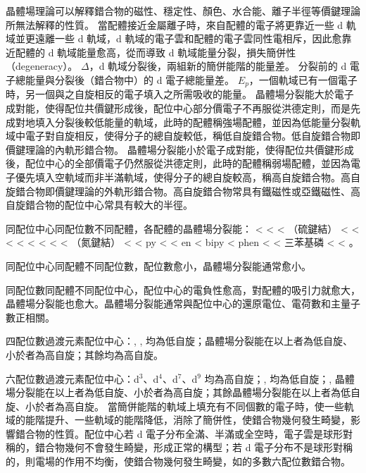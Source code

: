 \documentclass[a4paper,12pt]{report}
\begin{document}
晶體場理論可以解釋錯合物的磁性、穩定性、顏色、水合能、離子半徑等價鍵理論所無法解釋的性質。
當配體接近金屬離子時，來自配體的電子將更靠近一些 d 軌域並更遠離一些 d 軌域，d 軌域的電子雲和配體的電子雲同性電相斥，因此愈靠近配體的 d 軌域能量愈高，從而導致 d 軌域能量分裂，損失簡併性（degeneracy）。
$\Delta$，d 軌域分裂後，兩組新的簡併能階的能量差。
分裂前的 d 電子總能量與分裂後（錯合物中）的 d 電子總能量差。
$E_p$，一個軌域已有一個電子時，另一個與之自旋相反的電子填入之所需吸收的能量。
晶體場分裂能大於電子成對能，使得配位共價鍵形成後，配位中心部分價電子不再服從洪德定則，而是先成對地填入分裂後較低能量的軌域，此時的配體稱強場配體，並因為低能量分裂軌域中電子對自旋相反，使得分子的總自旋較低，稱低自旋錯合物。低自旋錯合物即價鍵理論的內軌形錯合物。
晶體場分裂能小於電子成對能，使得配位共價鍵形成後，配位中心的全部價電子仍然服從洪德定則，此時的配體稱弱場配體，並因為電子優先填入空軌域而非半滿軌域，使得分子的總自旋較高，稱高自旋錯合物。高自旋錯合物即價鍵理論的外軌形錯合物。高自旋錯合物常具有鐵磁性或亞鐵磁性、高自旋錯合物的配位中心常具有較大的半徑。
\bit
\item 同配位中心同配位數不同配體，各配體的晶體場分裂能： <  <  < （硫鍵結） <  <  <  <  <  <  <  < （氮鍵結） <  < py <  < en < bipy < phen <  < 三苯基磷  <  < 。
\item 同配位中心同配體不同配位數，配位數愈小，晶體場分裂能通常愈小。
\item 同配位數同配體不同配位中心，配位中心的電負性愈高，對配體的吸引力就愈大，晶體場分裂能也愈大。晶體場分裂能通常與配位中心的還原電位、電荷數和主量子數正相關。
\item 四配位數過渡元素配位中心：, , 均為低自旋；晶體場分裂能在以上者為低自旋、小於者為高自旋；其餘均為高自旋。
\item 六配位數過渡元素配位中心：d$^3$、d$^4$、d$^7$、d$^9$ 均為高自旋；, 均為低自旋；, 晶體場分裂能在以上者為低自旋、小於者為高自旋；其餘晶體場分裂能在以上者為低自旋、小於者為高自旋。
\eit
{}
當簡併能階的軌域上填充有不同個數的電子時，使一些軌域的能階提升、一些軌域的能階降低，消除了簡併性，使錯合物幾何發生畸變，影響錯合物的性質。配位中心若 d 電子分布全滿、半滿或全空時，電子雲是球形對稱的，錯合物幾何不會發生畸變，形成正常的構型；若 d 電子分布不是球形對稱的，則電場的作用不均衡，使錯合物幾何發生畸變，如的多數六配位數錯合物。
\end{document}
